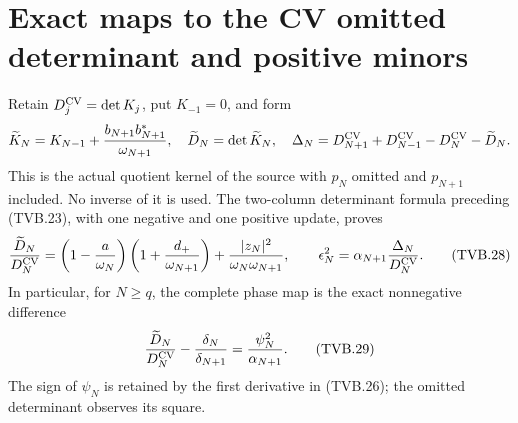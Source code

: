 \documentclass[11pt]{article}
\begin{document}
\section{Exact maps to the CV omitted determinant and positive minors}

Retain $D_j^{\rm CV}=\det K_j$, put $K_{-1}=0$, and form
\[
 \widetilde K_N=K_{N-1}
        +\frac{b_{N+1}b_{N+1}^*}{\omega_{N+1}},\quad
 \widetilde D_N=\det\widetilde K_N,\quad
 \Delta_N=D_{N+1}^{\rm CV}+D_{N-1}^{\rm CV}
                         -D_N^{\rm CV}-\widetilde D_N.
\]
This is the actual quotient kernel of the source with $p_N$
omitted and $p_{N+1}$ included. No inverse of it is used.
The two-column determinant formula preceding (TVB.23), with one
negative and one positive update, proves
\[
 \frac{\widetilde D_N}{D_N^{\rm CV}}
 =\left(1-\frac a{\omega_N}\right)
       \left(1+\frac{d_+}{\omega_{N+1}}\right)
        +\frac{|z_N|^2}{\omega_N\omega_{N+1}},\qquad
 \epsilon_N^2=\alpha_{N+1}\frac{\Delta_N}{D_N^{\rm CV}}.
 \tag{TVB.28}
\]
In particular, for $N\ge q$, the complete phase map is the exact
nonnegative difference
\[
 \frac{\widetilde D_N}{D_N^{\rm CV}}
 -\frac{\delta_N}{\delta_{N+1}}
 =\frac{\psi_N^2}{\alpha_{N+1}}.
 \tag{TVB.29}
\]
The sign of $\psi_N$ is retained by the first derivative in
(TVB.26); the omitted determinant observes its square.
\end{document}
